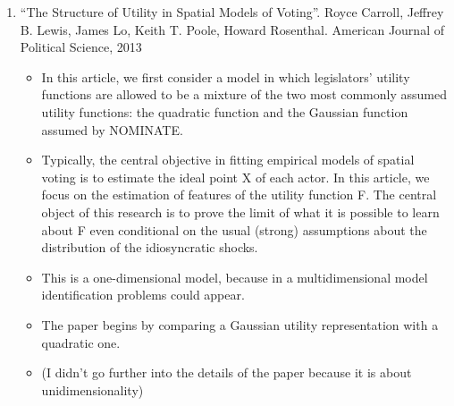 \documentclass[a4paper,12pt]{article}
\begin{document}
\begin{enumerate}
\item “The Structure of Utility in Spatial Models of Voting”. Royce Carroll, Jeffrey B. Lewis, James Lo, Keith T. Poole, Howard Rosenthal. American Journal of Political Science, 2013   
\begin{itemize}
\item In this article, we first consider a model in which legislators' utility functions are allowed to be a mixture of the two most commonly assumed utility functions: the quadratic function and the Gaussian function assumed by NOMINATE.
\item Typically, the central objective in fitting empirical models of spatial voting is to estimate the ideal point X of each actor. In this article, we focus on the estimation of features of the utility function F. The central object of this research is to prove the limit of what it is possible to learn about F even conditional on the usual (strong) assumptions about the distribution of the idiosyncratic shocks. 
\item This is a one-dimensional model, because in a multidimensional model identification problems could appear.  
\item The paper begins by comparing a Gaussian utility representation with a quadratic one.  
\item (I didn’t go further into the details of the paper because it is about unidimensionality) 
\end{itemize}



\newpage



\end{enumerate}
\end{document}
